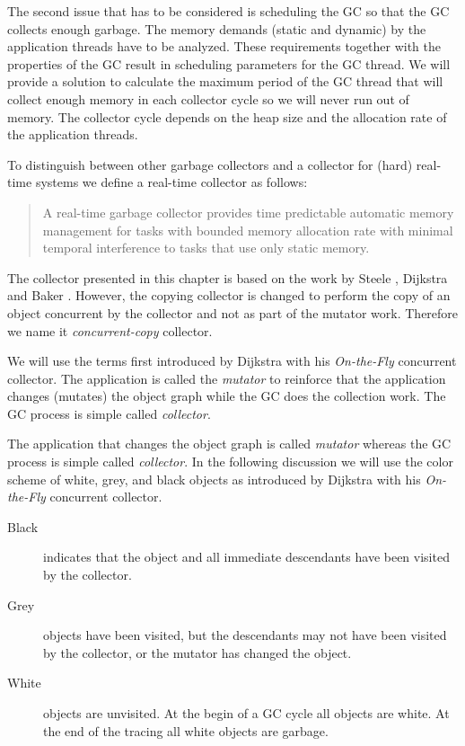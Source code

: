 The second issue that has to be considered is scheduling the GC so
that the GC collects enough garbage. The memory demands (static and
dynamic) by the application threads have to be analyzed. These
requirements together with the properties of the GC result in
scheduling parameters for the GC thread. We will provide a solution
to calculate the maximum period of the GC thread that will collect
enough memory in each collector cycle so we will never run out of
memory. The collector cycle depends on the heap size and the
allocation rate of the application threads.

To distinguish between other garbage collectors and a collector for
(hard) real-time systems we define a real-time collector as follows:

\begin{quote}
    A real-time garbage collector provides time predictable
    automatic memory management for tasks with bounded memory
    allocation rate with minimal temporal interference to tasks
    that use only static memory.
\end{quote}


The collector presented in this chapter is based on the work by
Steele \cite{gc:steele75},  Dijkstra \cite{gc:dijkstra78} and Baker
\cite{gc:baker78}. However, the copying collector is changed to
perform the copy of an object concurrent by the collector and not as
part of the mutator work. Therefore we name it
\emph{concurrent-copy} collector.

We will use the terms first introduced by Dijkstra with his
\emph{On-the-Fly} concurrent collector. The application is called
the \emph{mutator} to reinforce that the application changes
(mutates) the object graph while the GC does the collection work.
The GC process is simple called \emph{collector}.

The application that changes the object graph is called
\emph{mutator} whereas the GC process is simple called
\emph{collector}. In the following discussion we will use the color
scheme of white, grey, and black objects as introduced by Dijkstra
with his \emph{On-the-Fly} concurrent collector.

\begin{description}
    \item[Black] indicates that the object and all immediate
    descendants have been visited by the collector.
    \item[Grey] objects have been visited, but the descendants may
    not have been visited by the collector, or the mutator has
    changed the object.
    \item[White] objects are unvisited. At the begin of a GC cycle
    all objects are white. At the end of the tracing all white
    objects are garbage.
\end{description}

